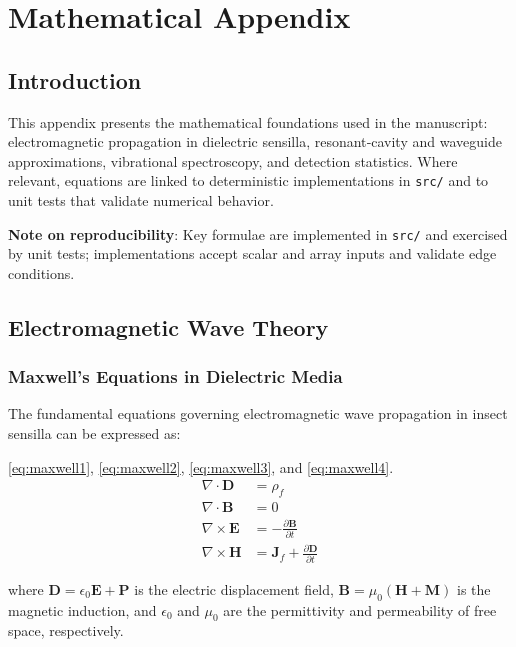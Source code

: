 \documentclass[
  13pt,
  a4paperpaper,
  12pt]{article}
\newcommand{\passthrough}[1]{#1}
\let\oldsection\section
\renewcommand{\section}{\clearpage\oldsection}
\begin{document}
\section{Mathematical Appendix}\label{sec:mathematical_appendix}

\subsection{Introduction}\label{introduction}

This appendix presents the mathematical foundations used in the
manuscript: electromagnetic propagation in dielectric sensilla,
resonant‑cavity and waveguide approximations, vibrational spectroscopy,
and detection statistics. Where relevant, equations are linked to
deterministic implementations in \passthrough{\lstinline!src/!} and to
unit tests that validate numerical behavior.

\textbf{Note on reproducibility}: Key formulae are implemented in
\passthrough{\lstinline!src/!} and exercised by unit tests;
implementations accept scalar and array inputs and validate edge
conditions.

\subsection{Electromagnetic Wave
Theory}\label{electromagnetic-wave-theory}

\subsubsection{Maxwell's Equations in Dielectric
Media}\label{maxwells-equations-in-dielectric-media}

The fundamental equations governing electromagnetic wave propagation in
insect sensilla can be expressed as:

\eqref{eq:maxwell1}, \eqref{eq:maxwell2}, \eqref{eq:maxwell3}, and
\eqref{eq:maxwell4}. \begin{align}
\nabla \cdot \mathbf{D} &= \rho_f \label{eq:maxwell1} \\
\nabla \cdot \mathbf{B} &= 0 \label{eq:maxwell2} \\
\nabla \times \mathbf{E} &= -\frac{\partial \mathbf{B}}{\partial t} \label{eq:maxwell3} \\
\nabla \times \mathbf{H} &= \mathbf{J}_f + \frac{\partial \mathbf{D}}{\partial t} \label{eq:maxwell4}
\end{align}

where \(\mathbf{D} = \epsilon_0 \mathbf{E} + \mathbf{P}\) is the
electric displacement field,
\(\mathbf{B} = \mu_0(\mathbf{H} + \mathbf{M})\) is the magnetic
induction, and \(\epsilon_0\) and \(\mu_0\) are the permittivity and
permeability of free space, respectively.
\end{document}

